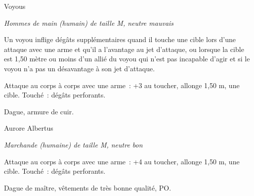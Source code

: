 \documentclass[a4paper,10pt,openany]{book}
\begin{document}
\begin{multicols}{2}
\begin{monsterbox}{Voyous}
	\begin{hangingpar}
		\textit{Hommes de main (humain) de taille M, neutre mauvais}
	\end{hangingpar}
	\dndline%
	\basics[%
	armorclass = 11 (armure de cuir),
	hitpoints  = \dice{2d8+2},
	speed      = 9 m
	]
	\dndline%
	\stats[
	STR = \stat{12},
	CON = \stat{12}
	]
	\dndline%
	\details[%
	senses= Perception passive 10,
	languages = {bas-thrain, vethrain},
	challenge= 1/4
	]
	\dndline%
	\begin{monsteraction}
		Un voyou inflige  dégâts supplémentaires quand il touche une cible lors d’une attaque avec une arme et qu’il a l’avantage au jet
		d’attaque, ou lorsque la cible est 1,50 mètre ou moins d’un allié du voyou qui n’est pas incapable d’agir et si le voyou n’a pas un désavantage à
		son jet d’attaque.
	\end{monsteraction}
	\begin{monsteraction}[Dague]
		Attaque au corps à corps avec une arme : +3 au toucher, allonge 1,50 m, une cible. Touché :  dégâts perforants.
	\end{monsteraction}
	\dndline%
	\begin{monsteraction}[Possessions]
		Dague, armure de cuir.
	\end{monsteraction}
\end{monsterbox}

\begin{monsterbox}{Aurore Albertus}
	\begin{hangingpar}
		\textit{Marchande (humaine) de taille M, neutre bon}
	\end{hangingpar}
	\dndline%
	\basics[%
	armorclass = 11,
	hitpoints  = \dice{4d8 + 4},
	speed      = 9 m
	]
	\dndline%
	\stats[
	DEX = \stat{12},
	CON = \stat{12},
	INT = \stat{14},
	CHA = \stat{16} 
	]
	\dndline%
	\details[%
	skills={Histoire +4, Religion +4, Perception +2, Perspicacité +2, Persuasion +5},
	senses= Perception passive 12,
	languages = {bas-thrain, vethrain, haut-thrain, elvish},
	challenge= 1/4
	]
	\dndline%
	\begin{monsteraction}[Dague]
		Attaque au corps à corps avec une arme : +4 au toucher, allonge 1,50 m, une cible. Touché :  dégâts perforants.
	\end{monsteraction}
	\dndline%
	\begin{monsteraction}[Possessions]
		Dague de maître, vêtements de très bonne qualité,  PO.
	\end{monsteraction}
\end{monsterbox}


\end{multicols}
\end{document}
